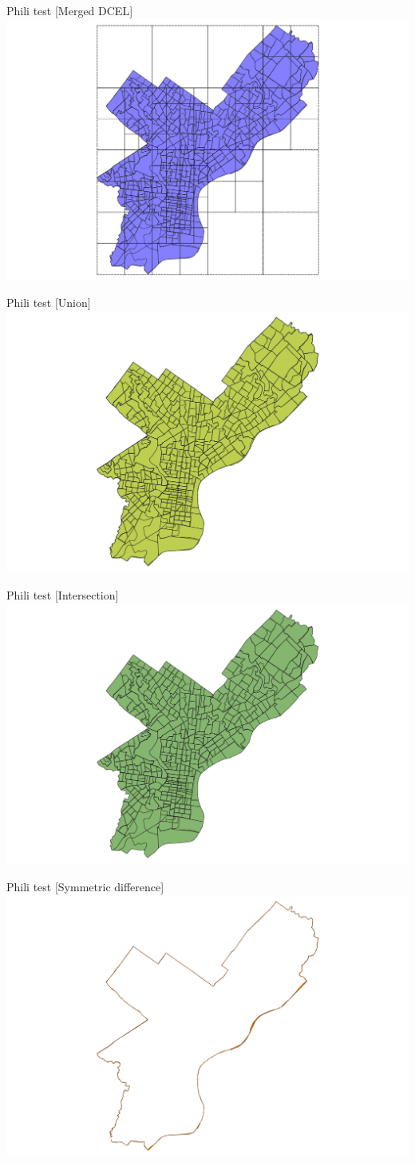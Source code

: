 \documentclass{beamer}
\begin{document}
\begin{frame}{Phili test [Merged DCEL]}
    \centering 
    \includegraphics[trim=6cm 0cm 6cm 0cm, clip, width=0.6\linewidth]{figures/faces} 
\end{frame}

\begin{frame}{Phili test [Union]}
    \centering 
    \includegraphics[trim=6cm 0cm 6cm 0cm, clip, width=0.6\linewidth]{figures/union} 
\end{frame}
\begin{frame}{Phili test [Intersection]}
    \centering 
    \includegraphics[trim=6cm 0cm 6cm 0cm, clip, width=0.6\linewidth]{figures/intersection} 
\end{frame}
\begin{frame}{Phili test [Symmetric difference]}
    \centering 
    \includegraphics[trim=6cm 0cm 6cm 0cm, clip, width=0.6\linewidth]{figures/symmetric} 
\end{frame}
\end{document}
